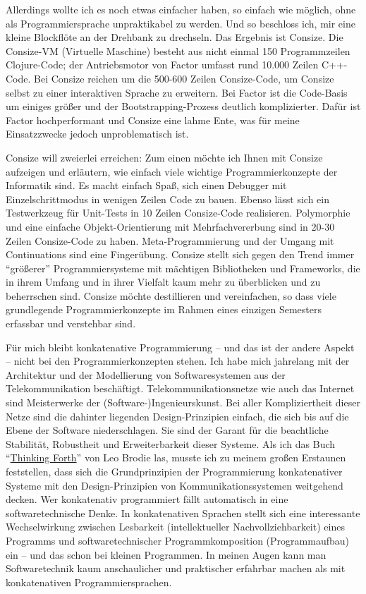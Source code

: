 Allerdings wollte ich es noch etwas einfacher haben, so einfach wie möglich, ohne als Programmiersprache unpraktikabel zu werden. Und so beschloss ich, mir eine kleine Blockflöte an der Drehbank zu drechseln. Das Ergebnis ist Consize. Die Consize-VM (Virtuelle Maschine) besteht aus nicht einmal 150 Programmzeilen Clojure-Code; der Antriebsmotor von Factor umfasst rund 10.000 Zeilen C++-Code. Bei Consize reichen um die 500-600 Zeilen Consize-Code, um Consize selbst zu einer interaktiven Sprache zu erweitern. Bei Factor ist die Code-Basis um einiges größer und der Bootstrapping-Prozess deutlich komplizierter. Dafür ist Factor hochperformant und Consize eine lahme Ente, was für meine Einsatzzwecke jedoch unproblematisch ist.

Consize will zweierlei erreichen: Zum einen möchte ich Ihnen mit Consize aufzeigen und erläutern, wie einfach viele wichtige Programmierkonzepte der Informatik sind. Es macht einfach Spaß, sich einen Debugger mit Einzelschrittmodus in wenigen Zeilen Code zu bauen. Ebenso lässt sich ein Testwerkzeug für Unit-Tests in  10 Zeilen Consize-Code realisieren. Polymorphie und eine einfache Objekt-Orientierung mit Mehrfachvererbung sind in 20-30 Zeilen Consize-Code zu haben. Meta-Pro\-gram\-mie\-rung und der Umgang mit Continuations sind eine Fingerübung. Consize stellt sich gegen den Trend immer "`größerer"' Programmiersysteme mit mächtigen Bibliotheken und Frameworks, die in ihrem Umfang und in ihrer Vielfalt kaum mehr zu überblicken und zu beherrschen sind. Consize möchte destillieren und vereinfachen, so dass viele grundlegende Programmierkonzepte im Rahmen eines einzigen Semesters erfassbar und verstehbar sind.  

Für mich bleibt konkatenative Programmierung -- und das ist der andere Aspekt -- nicht bei den Programmierkonzepten stehen.
Ich habe mich jahrelang mit der Architektur und der Modellierung von Softwaresystemen aus der Telekommunikation beschäftigt. Telekommunikationsnetze wie auch das Internet sind Meisterwerke der (Software-)Ingenieurskunst. Bei aller Kompliziertheit dieser Netze sind die dahinter liegenden Design-Prinzipien einfach, die sich bis auf die Ebene der Software niederschlagen. Sie sind der Garant für die beachtliche Stabilität, Robustheit und Erweiterbarkeit dieser Systeme. Als ich das Buch "`\href{http://thinking-forth.sourceforge.net/}{Thinking Forth}"' von {\sc Leo Brodie} las, musste ich zu meinem großen Erstaunen feststellen, dass sich die Grundprinzipien der Programmierung konkatenativer Systeme mit den Design-Prinzipien von Kommunikationssystemen weitgehend decken. Wer konkatenativ programmiert fällt automatisch in eine softwaretechnische Denke. In konkatenativen Sprachen stellt sich eine interessante Wechselwirkung zwischen Lesbarkeit (intellektueller Nachvollziehbarkeit) eines Programms und softwaretechnischer Programmkomposition (Programmaufbau) ein -- und das schon bei kleinen Programmen. In meinen Augen kann man Softwaretechnik kaum anschaulicher und praktischer erfahrbar machen als mit konkatenativen Programmiersprachen.

